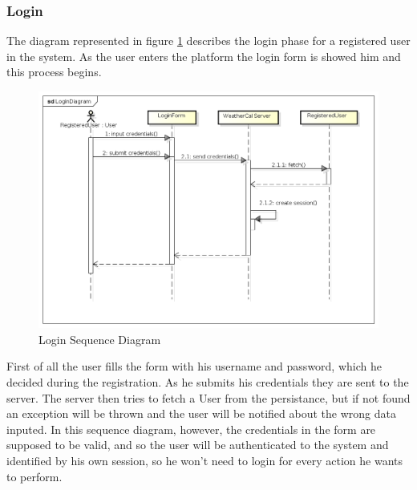 \subsubsection{Login}
The diagram represented in figure \ref{fig:logseqdiag} describes the login phase for a registered user in the system. As the user enters the platform the login form is showed him and this process begins.
\begin{center}
 \begin{figure}[H]
    \includegraphics[width=1\textwidth]{./UMLDiagram/sequence/LoginDiagram/LoginDiagram.png}
    \caption{Login Sequence Diagram}
     \label{fig:logseqdiag}
     \end{figure}
   \end{center}
First of all the user fills the form with his username and password, which he decided during the registration. As he submits his credentials they are sent to the server. The server then tries to fetch a User from the persistance, but if not found an exception will be thrown and the user will be notified about the wrong data inputed. In this sequence diagram, however, the credentials in the form are supposed to be valid, and so the user will be authenticated to the system and identified by his own session, so he won't need to login for every action he wants to perform.
